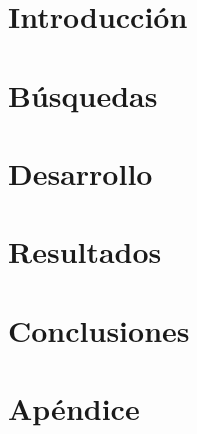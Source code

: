 \documentclass[11pt,a4paper]{tesis}
\begin{document}
\def\titulo{Licenciado }
\def\autor{Amit Stein, Juan Andrés Knebel}
\def\tituloTesis{Composite Retrival: \mbox{Algo}}
\def\runtitulo{Composite Retrival en español}
\def\runtitle{Composite Retrival en ingles}
\def\director{Obi-Wan Kenobi}
\def\codirector{Master Yoda}
\def\lugar{Buenos Aires, 2014}
%

\frontmatter
\pagestyle{empty}
%

%



\cleardoublepage
\tableofcontents

\mainmatter
\pagestyle{headings}


\chapter{Introducción}

\chapter{Búsquedas}

\chapter{Desarrollo}

\chapter{Resultados}

\chapter{Conclusiones}

\chapter{Apéndice}



%

%
\end{document}
